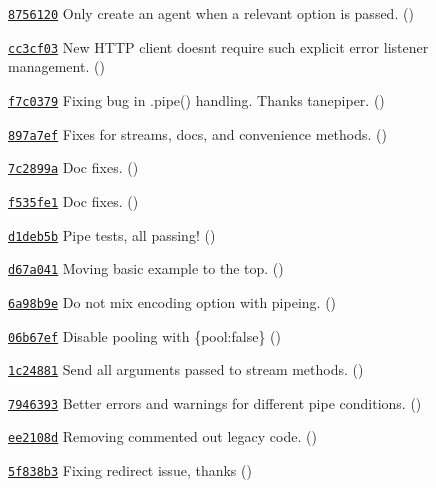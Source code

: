 \begin{DoxyItemize}
\item \href{https://github.com/mikeal/request/commit/8756120f83ceb94f8ba600acba274ba512696eef}{\tt 8756120} Only create an agent when a relevant option is passed. ()
\item \href{https://github.com/mikeal/request/commit/cc3cf0322847982875ff32a7cef25c39c29630ba}{\tt cc3cf03} New H\+T\+T\+P client doesn\textquotesingle{}t require such explicit error listener management. ()
\item \href{https://github.com/mikeal/request/commit/f7c0379b99ac7989df7f934be67cc3ae979591bb}{\tt f7c0379} Fixing bug in .pipe() handling. Thanks tanepiper. ()
\item \href{https://github.com/mikeal/request/commit/897a7ef020cefcb7a36c04a11e286238df8ecdaa}{\tt 897a7ef} Fixes for streams, docs, and convenience methods. ()
\item \href{https://github.com/mikeal/request/commit/7c2899a046b750eda495b23b2d58604260deddbc}{\tt 7c2899a} Doc fixes. ()
\item \href{https://github.com/mikeal/request/commit/f535fe1008c8f11bb37e16f95fe287ed93343704}{\tt f535fe1} Doc fixes. ()
\item \href{https://github.com/mikeal/request/commit/d1deb5b4dda4474fe9d480ad42ace664d89e73ee}{\tt d1deb5b} Pipe tests, all passing! ()
\item \href{https://github.com/mikeal/request/commit/d67a041783df8d724662d82f9fb792db1be3f4f0}{\tt d67a041} Moving basic example to the top. ()
\item \href{https://github.com/mikeal/request/commit/6a98b9e4a561b516b14d325c48785a9d6f40c514}{\tt 6a98b9e} Do not mix encoding option with pipeing. ()
\item \href{https://github.com/mikeal/request/commit/06b67ef01f73572a6a9b586854d4c21be427bdb2}{\tt 06b67ef} Disable pooling with \{pool\+:false\} ()
\item \href{https://github.com/mikeal/request/commit/1c248815b5dfffda43541e367bd4d66955ca0325}{\tt 1c24881} Send all arguments passed to stream methods. ()
\item \href{https://github.com/mikeal/request/commit/7946393893e75df24b390b7ab19eb5b9d6c23891}{\tt 7946393} Better errors and warnings for different pipe conditions. ()
\item \href{https://github.com/mikeal/request/commit/ee2108db592113a0fe3840c361277fdd89f0c89c}{\tt ee2108d} Removing commented out legacy code. ()
\item \href{https://github.com/mikeal/request/commit/5f838b3582eda465f366d7df89c6dd69920405f2}{\tt 5f838b3} Fixing redirect issue, thanks  ()

\end{DoxyItemize}
